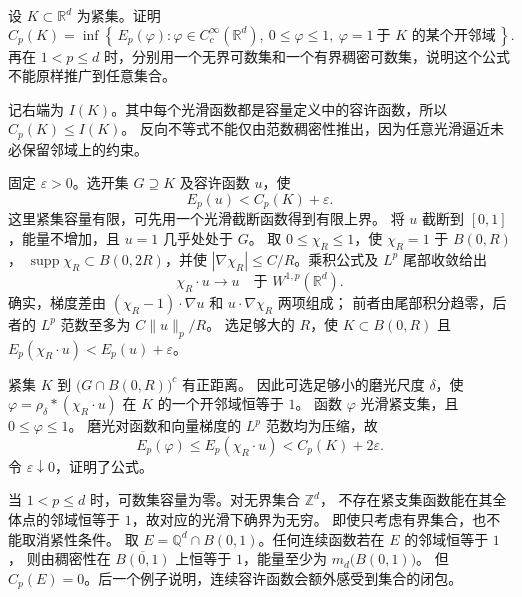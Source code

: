 \begin{exercise}\label{b1:ex:26-compact-smooth-admissibility}
设 \(K\subset\mathbb R^d\) 为紧集。证明
\[
 C_p(K)=\inf\left\{\,E_p(\varphi):
   \varphi\in C_c^\infty(\mathbb R^d),\
   0\le\varphi\le1,\
   \varphi=1\ \text{于 }K\text{ 的某个开邻域}\,\right\}.
\]
再在 \(1<p\le d\) 时，分别用一个无界可数集和一个有界稠密可数集，说明这个公式不能原样推广到任意集合。
\end{exercise}
\begin{solution}
记右端为 \(I(K)\)。其中每个光滑函数都是容量定义中的容许函数，所以 \(C_p(K)\le I(K)\)。
反向不等式不能仅由范数稠密性推出，因为任意光滑逼近未必保留邻域上的约束。

固定 \(\varepsilon>0\)。选开集 \(G\supseteq K\) 及容许函数 \(u\)，使
\[
 E_p(u)<C_p(K)+\varepsilon.
\]
这里紧集容量有限，可先用一个光滑截断函数得到有限上界。
将 \(u\) 截断到 \([0,1]\)，能量不增加，且 \(u=1\) 几乎处处于 \(G\)。
取 \(0\le\chi_R\le1\)，使 \(\chi_R=1\) 于 \(B(0,R)\)，
\(\operatorname{supp}\chi_R\subset B(0,2R)\)，并使
\(|\nabla\chi_R|\le C/R\)。乘积公式及 \(L^p\) 尾部收敛给出
\[
 \chi_R\cdot u\longrightarrow u\quad\text{于 }W^{1,p}(\mathbb R^d).
\]
确实，梯度差由 \((\chi_R-1)\cdot\nabla u\) 和 \(u\cdot\nabla\chi_R\) 两项组成；
前者由尾部积分趋零，后者的 \(L^p\) 范数至多为 \(C\|u\|_p/R\)。
选足够大的 \(R\)，使 \(K\subset B(0,R)\) 且
\(E_p(\chi_R\cdot u)<E_p(u)+\varepsilon\)。

紧集 \(K\) 到 \(\bigl(G\cap B(0,R)\bigr)^c\) 有正距离。
因此可选足够小的磨光尺度 \(\delta\)，使
\(\varphi=\rho_\delta*(\chi_R\cdot u)\) 在 \(K\) 的一个开邻域恒等于 \(1\)。
函数 \(\varphi\) 光滑紧支集，且 \(0\le\varphi\le1\)。
磨光对函数和向量梯度的 \(L^p\) 范数均为压缩，故
\[
 E_p(\varphi)\le E_p(\chi_R\cdot u)<C_p(K)+2\varepsilon.
\]
令 \(\varepsilon\downarrow0\)，证明了公式。

当 \(1<p\le d\) 时，可数集容量为零。对无界集合 \(\mathbb Z^d\)，
不存在紧支集函数能在其全体点的邻域恒等于 \(1\)，故对应的光滑下确界为无穷。
即使只考虑有界集合，也不能取消紧性条件。
取 \(E=\mathbb Q^d\cap B(0,1)\)。任何连续函数若在 \(E\) 的邻域恒等于 \(1\)，
则由稠密性在 \(\overline{B(0,1)}\) 上恒等于 \(1\)，能量至少为 \(m_d\bigl(B(0,1)\bigr)\)。
但 \(C_p(E)=0\)。后一个例子说明，连续容许函数会额外感受到集合的闭包。
\end{solution}

